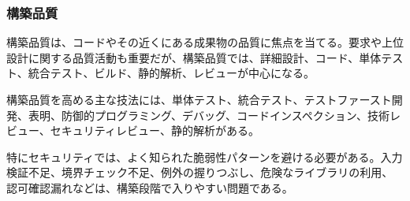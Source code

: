 \subsubsection{構築品質}

構築品質は、コードやその近くにある成果物の品質に焦点を当てる。要求や上位設計に関する品質活動も重要だが、構築品質では、詳細設計、コード、単体テスト、統合テスト、ビルド、静的解析、レビューが中心になる。

構築品質を高める主な技法には、単体テスト、統合テスト、テストファースト開発、表明、防御的プログラミング、デバッグ、コードインスペクション、技術レビュー、セキュリティレビュー、静的解析がある。

特にセキュリティでは、よく知られた脆弱性パターンを避ける必要がある。入力検証不足、境界チェック不足、例外の握りつぶし、危険なライブラリの利用、認可確認漏れなどは、構築段階で入りやすい問題である。
